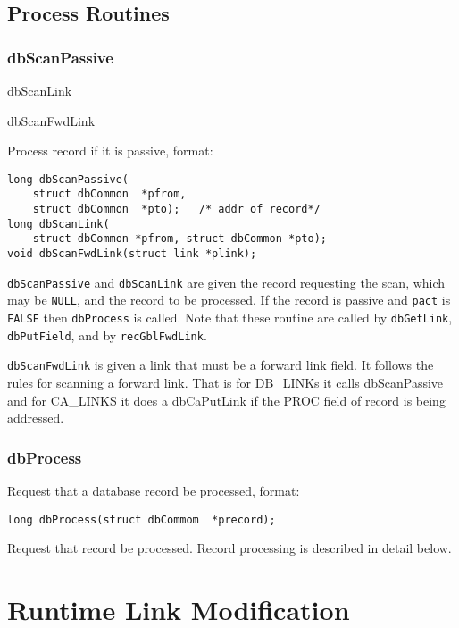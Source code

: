\subsection{Process Routines}

\subsubsection{dbScanPassive}

dbScanLink

dbScanFwdLink

Process record if it is passive, format:

\begin{verbatim}
long dbScanPassive(
    struct dbCommon  *pfrom,
    struct dbCommon  *pto);   /* addr of record*/
long dbScanLink(
    struct dbCommon *pfrom, struct dbCommon *pto);
void dbScanFwdLink(struct link *plink);
\end{verbatim}

 \verb|dbScanPassive| and \verb|dbScanLink| are given the record requesting the scan, which may be \verb|NULL|, and the record to be processed.
If the record is passive and \verb|pact| is \verb|FALSE| then \verb|dbProcess| is called.
Note that these routine are called by \verb|dbGetLink|, \verb|dbPutField|, and by \verb|recGblFwdLink|.

\verb|dbScanFwdLink| is given a link that must be a forward link field.
It follows the rules for scanning a forward link.
That is for DB\_LINKs it calls dbScanPassive and for CA\_LINKS it does a dbCaPutLink if the PROC field of record is being addressed.

\subsubsection{dbProcess }

Request that a database record be processed, format:

\begin{verbatim}
long dbProcess(struct dbCommom  *precord);
\end{verbatim}

Request that record be processed.
Record processing is described in detail below.

\section{Runtime Link Modification}

